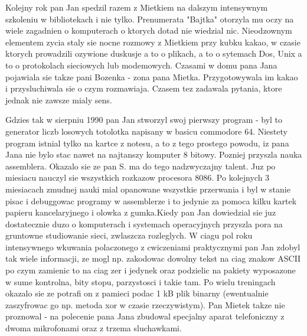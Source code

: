 \documentclass[a4paper,polish,titlepage,12pt]{article}
\begin{document}
Kolejny rok pan Jan spedzil razem z Mietkiem na dalszym intensywnym szkoleniu w bibliotekach i nie tylko. Prenumerata "Bajtka" otorzyla mu oczy na wiele zagadnien o komputerach o ktorych dotad nie wiedzial nic. Nieodzownym elementem zycia staly sie nocne rozmowy z Mietkiem przy kubku kakao, w czasie ktorych prowadzili ozywione duskusje a to o plikach, a to o sytemach Dos, Unix a to o protokolach sieciowych lub modemowych. Czasami w domu pana Jana pojawiala sie takze pani Bozenka - zona pana Mietka. Przygotowywala im kakao i przysluchiwala sie o czym rozmawiaja. Czasem tez zadawala pytania, ktore jednak nie zawsze mialy sens.

Gdzies tak w sierpniu 1990 pan Jan stworzyl swoj pierwszy program - byl to generator liczb losowych totolotka napisany w basicu commodore 64. Niestety program istnial tylko na kartce z notesu, a to z tego prostego powodu, iz pana Jana nie bylo stac nawet na najtanszy komputer 8 bitowy. Pozniej przyszla nauka assemblera. Okazalo sie ze pan S. ma do tego nadzwyczajny talent. Juz po miesiacu nauczyl sie wszystkich rozkazow procesora 8086. Po kolejnych 3 miesiacach zmudnej nauki mial opanowane wszystkie przerwania i byl w stanie pisac i debuggowac programy w assemblerze i to jedynie za pomoca kilku kartek papieru kancelaryjnego i olowka z gumka.Kiedy pan Jan dowiedzial sie juz dostatecznie duzo o komputerach i systemach operacyjnych przyszla pora na gruntowne studiowanie sieci, zwlaszcza rozleglych. W ciagu pol roku intensywnego wkuwania polaczonego z cwiczeniami praktycznymi pan Jan zdobyl tak wiele informacji, ze mogl np. zakodowac dowolny tekst na ciag znakow ASCII po czym zamienic to na ciag zer i jedynek oraz podzielic na pakiety wyposazone w sume kontrolna, bity stopu, parzystosci i takie tam. Po wielu treningach okazalo sie ze potrafi on z pamieci podac 1 kB plik binarny (ewentualnie zaszyfrowac go np. metoda xor w czasie rzeczywistym). Pan Mietek takze nie proznowal - na polecenie pana Jana zbudowal specjalny aparat telefoniczny z dwoma mikrofonami oraz z trzema sluchawkami.
\end{document}
